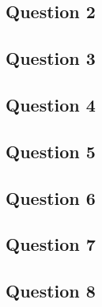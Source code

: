 \documentclass{article}
\begin{document}

\subsection*{Question 2}



\subsection*{Question 3}


\subsection*{Question 4}



\subsection*{Question 5}



\subsection*{Question 6}



\subsection*{Question 7}



\subsection*{Question 8}


\end{document}
